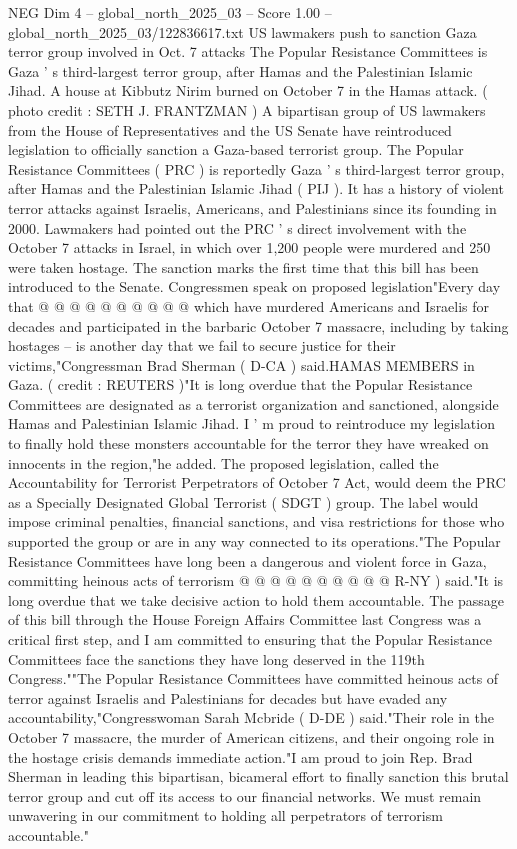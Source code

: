 \begin{textsample}{NEG Dim 4 – global\_north\_2025\_03 – Score 1.00 – global\_north\_2025\_03/122836617.txt}  \label{ex:f4_neg_395}
US lawmakers push to sanction Gaza terror group involved in Oct. 7 attacks The Popular Resistance Committees is Gaza ' s third-largest terror group, after Hamas and the Palestinian Islamic Jihad.
A house at Kibbutz Nirim burned on October 7 in the Hamas attack. ( photo credit : SETH J.
FRANTZMAN ) A bipartisan group of US lawmakers from the House of Representatives and the US Senate have reintroduced legislation to officially sanction a Gaza-based terrorist group.
The Popular Resistance Committees ( PRC ) is reportedly Gaza ' s third-largest terror group, after Hamas and the Palestinian Islamic Jihad ( PIJ ).
It has a history of violent terror attacks against Israelis, Americans, and Palestinians since its founding in 2000.
Lawmakers had pointed out the PRC ' s direct involvement with the October 7 attacks in Israel, in which over 1,200 people were murdered and 250 were taken hostage.
The sanction marks the first time that this bill has been introduced to the Senate.
Congressmen speak on proposed legislation"Every day that @ @ @ @ @ @ @ @ @ @ which have murdered Americans and Israelis for decades and participated in the barbaric October 7 massacre, including by taking hostages -- is another day that we fail to secure justice for their victims,"Congressman Brad Sherman ( D-CA ) said.HAMAS MEMBERS in Gaza. ( credit : REUTERS )"It is long overdue that the Popular Resistance Committees are designated as a terrorist organization and sanctioned, alongside Hamas and Palestinian Islamic Jihad.
I ' m proud to reintroduce my legislation to finally hold these monsters accountable for the terror they have wreaked on innocents in the region,"he added.
The proposed legislation, called the Accountability for Terrorist Perpetrators of October 7 Act, would deem the PRC as a Specially Designated Global Terrorist ( SDGT ) group.
The label would impose criminal penalties, financial sanctions, and visa restrictions for those who supported the group or are in any way connected to its operations."The Popular Resistance Committees have long been a dangerous and violent force in Gaza, committing heinous acts of terrorism @ @ @ @ @ @ @ @ @ @ R-NY ) said."It is long overdue that we take decisive action to hold them accountable.
The passage of this bill through the House Foreign Affairs Committee last Congress was a critical first step, and I am committed to ensuring that the Popular Resistance Committees face the sanctions they have long deserved in the 119th Congress.""The Popular Resistance Committees have committed heinous acts of terror against Israelis and Palestinians for decades but have evaded any accountability,"Congresswoman Sarah Mcbride ( D-DE ) said."Their role in the October 7 massacre, the murder of American citizens, and their ongoing role in the hostage crisis demands immediate action."I am proud to join Rep.
Brad Sherman in leading this bipartisan, bicameral effort to finally sanction this brutal terror group and cut off its access to our financial networks.
We must remain unwavering in our commitment to holding all perpetrators of terrorism accountable."

\end{textsample}
